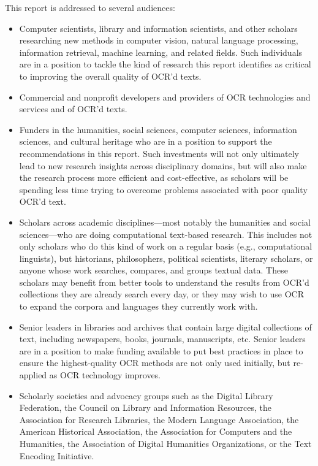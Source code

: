 \documentclass[twoside,11pt]{report}
\begin{document}
This report is addressed to several audiences:
\begin{itemize}

\item Computer scientists, library and information scientists, and other scholars researching new methods in computer vision, natural language processing, information retrieval, machine learning, and related fields. Such individuals are in a position to tackle the kind of research this report identifies as critical to improving the overall quality of OCR'd texts.

\item Commercial and nonprofit developers and providers of OCR technologies and services and of OCR'd texts.

\item Funders in the humanities, social sciences, computer sciences, information sciences, and cultural heritage who are in a position to support the recommendations in this report. Such investments will not only ultimately lead to new research insights across disciplinary domains, but will also make the research process more efficient and cost-effective, as scholars will be spending less time trying to overcome problems associated with poor quality OCR'd text.

\item Scholars across academic disciplines---most notably the humanities and social sciences---who are doing computational text-based research. This includes not only scholars who do this kind of work on a regular basis (e.g., computational linguists), but historians, philosophers, political scientists, literary scholars, or anyone whose work searches, compares, and groups textual data. These scholars may benefit from better tools to understand the results from OCR'd collections they are already search every day, or they may wish to use OCR to expand the corpora and languages they currently work with.

\item Senior leaders in libraries and archives that contain large digital collections of text, including newspapers, books, journals, manuscripts, etc. Senior leaders are in a position to make funding available to put best practices in place to ensure the highest-quality OCR methods are not only used initially, but re-applied as OCR technology improves.

\item Scholarly societies and advocacy groups such as the Digital Library Federation, the Council on Library and Information Resources, the Association for Research Libraries, the Modern Language Association, the American Historical Association, the Association for Computers and the Humanities, the Association of Digital Humanities Organizations, or the Text Encoding Initiative.

\end{itemize}
\end{document}
